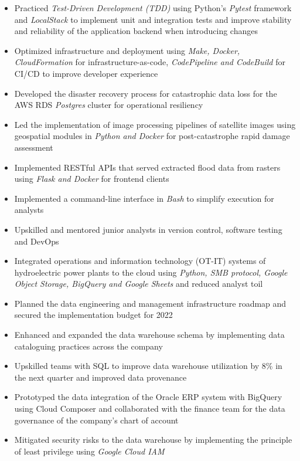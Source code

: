 \begin{itemize}
  \item Practiced \emph{Test-Driven Development (TDD)} using Python's \emph{Pytest} framework and \emph{LocalStack} to implement unit and integration tests and improve stability and reliability of the application backend when introducing changes
  \item Optimized infrastructure and deployment using \emph{Make, Docker, CloudFormation} for infrastructure-as-code, \emph{CodePipeline and CodeBuild} for CI/CD to improve developer experience
  \item Developed the disaster recovery process for catastrophic data loss for the AWS RDS \emph{Postgres} cluster for operational resiliency
\end{itemize}

\begin{itemize}
  \item Led the implementation of image processing pipelines of satellite images using geospatial modules in \emph{Python and Docker} for post-catastrophe rapid damage assessment
  \item Implemented RESTful APIs that served extracted flood data from rasters using \emph{Flask and Docker} for frontend clients
  \item Implemented a command-line interface in \emph{Bash} to simplify execution for analysts
  \item Upskilled and mentored junior analysts in version control, software testing and DevOps
\end{itemize}

\newpage
{}
\begin{itemize}
  \item Integrated operations and information technology (OT-IT) systems of hydroelectric power plants to the cloud using \emph{Python, SMB protocol, Google Object Storage, BigQuery and Google Sheets} and reduced analyst toil
  \item Planned the data engineering and management infrastructure roadmap and secured the implementation budget for 2022
  \item Enhanced and expanded the data warehouse schema by implementing data cataloguing practices across the company
  \item Upskilled teams with SQL to improve data warehouse utilization by 8\% in the next quarter and improved data provenance
  \item Prototyped the data integration of the Oracle ERP system with BigQuery using Cloud Composer and collaborated with the finance team for the data governance of the company's chart of account
  \item Mitigated security risks to the data warehouse by implementing the principle of least privilege using \emph{Google Cloud IAM}
\end{itemize}

